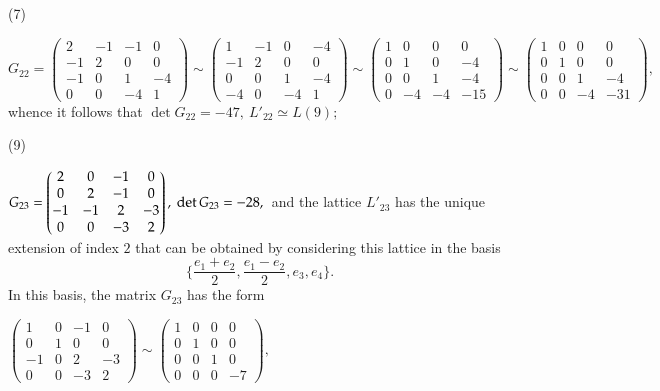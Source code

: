 \documentclass[14pt]{article}
\begin{document}
\begin{small}
\vskip 1cm

(7)

\vskip 1cm

$
G_{22} =
\begin{pmatrix}
2 & -1 & -1 & 0\\
-1 & 2 & 0 & 0\\
-1 & 0 & 1 & -4\\
0 & 0 & -4 & 1
\end{pmatrix} \sim
\begin{pmatrix}
1 & -1 & 0 & -4\\
-1 & 2 & 0 & 0\\
0 & 0 & 1 & -4\\
-4 & 0 & -4 & 1
\end{pmatrix}\sim
\begin{pmatrix}
1 & 0 & 0 & 0\\
0 & 1 & 0 & -4\\
0 & 0 & 1 & -4\\
0 & -4 & -4 & -15
\end{pmatrix}\sim
\begin{pmatrix}
1 & 0 & 0 & 0\\
0 & 1 & 0 & 0\\
0 & 0 & 1 & -4\\
0 & 0 & -4 & -31
\end{pmatrix},
$
\vskip 0.4cm
whence it follows that
$\det G_{22} = -47, \ L'_{22} \simeq L(9);$

\vskip 1cm

(9)

\vskip 1cm

$
G_{23} =
\begin{pmatrix}
2 & 0 & -1 & 0\\
0 & 2 & -1 & 0\\
-1 & -1 & 2 & -3\\
0 & 0 & -3 & 2
\end{pmatrix}, \ \det G_{23} = -28,\\
$
and the lattice $L'_{23}$ has the unique extension  of index  $2$ that
can be obtained by considering this lattice in the basis
$$\Big\{\dfrac{e_1 + e_2}{2},  \dfrac{e_1 - e_2}{2},  e_3, e_4\Big\}.$$
In this basis, the matrix $G_{23}$ has the form

$
 \begin{pmatrix}
1 & 0 & -1 & 0\\
0 & 1 & 0 & 0\\
-1 & 0 & 2 & -3\\
0 & 0 & -3 & 2
\end{pmatrix}\sim
 \begin{pmatrix}
1 & 0 & 0 & 0\\
0 & 1 & 0 & 0\\
0 & 0 & 1 & 0\\
0 & 0 & 0 & -7
\end{pmatrix},
$


\end{small}
\end{document}
